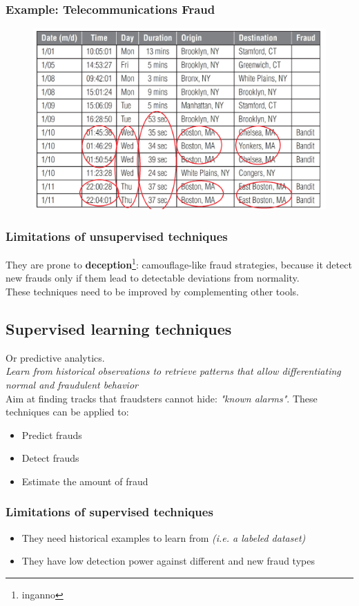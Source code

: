         \subsubsection{Example: Telecommunications Fraud}
            \begin{figure}
                \centering
                \includegraphics[width=0.6\linewidth]{telecom.png}
            \end{figure}
        \subsubsection{Limitations of unsupervised techniques}
            They are prone to \textbf{deception}\footnote{inganno}: camouflage-like fraud strategies, because it detect new frauds only if them lead to detectable deviations from normality.\\
            These techniques need to be improved by complementing other tools.
    \subsection{Supervised learning techniques}
        Or predictive analytics.\\
        \textit{Learn from historical observations to retrieve patterns that allow differentiating normal and fraudulent behavior}\\
        Aim at finding tracks that fraudsters cannot hide: \textit{"known alarms"}.
        These techniques can be applied to:
        \begin{itemize}
            \item Predict frauds 
            \item Detect frauds 
            \item Estimate the amount of fraud 
        \end{itemize}
        \subsubsection{Limitations of supervised techniques}
            \begin{itemize}
                \item They need historical examples to learn from \textit{(i.e. a labeled dataset)}
                \item They have low detection power against different and new fraud types
            \end{itemize}
